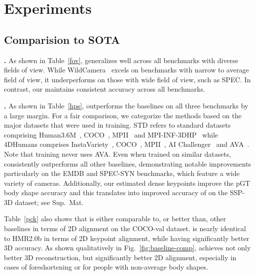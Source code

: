 \section{Experiments}

\subsection{Comparision to SOTA}
\noindent\textbf{\cameramodel.}
As shown in Table~\ref{fov},  \cameramodel generalizes well across all benchmarks with diverse fields of view. While WildCamera~\cite{wildcamera} excels on benchmarks with narrow to average field of view, it underperforms on those with wide field of view, such as SPEC. In contrast, our \cameramodel maintains consistent accuracy across all benchmarks.

\noindent\textbf{\hpsmodel.}
As shown in Table~\ref{hps}, \hpsmodel outperforms the baselines on all three benchmarks by a large margin. For a fair comparison, we categorize the methods based on the major datasets that were used in training. 
STD refers to standard datasets comprising Human3.6M~\cite{h36m}, COCO~\cite{coco}, MPII~\cite{mpii} and MPI-INF-3DHP~\cite{mpiinf3dhp} while 4DHumans comprises InstaVariety~\cite{insta}, COCO~\cite{coco}, MPII~\cite{mpii}, AI Challenger~\cite{aic} and  AVA~\cite{ava}. 
Note that \hpsmodel training never uses AVA.
Even when trained on similar datasets, \hpsmodel consistently outperforms all other baselines, demonstrating notable improvements particularly on the  EMDB and SPEC-SYN benchmarks, which feature a wide variety of cameras. 
Additionally, our estimated dense keypoints improve the pGT body shape accuracy and this translates into improved accuracy of \hpsmodel on the SSP-3D \cite{ssp} dataset; see Sup.~Mat. 

Table~\ref{pck} also shows that \hpsmodel is either comparable to, or better than, other baselines in terms of 2D alignment on the COCO-val dataset.
\hpsmodel is nearly identical to HMR2.0b in terms of 2D keypoint alignment, while having significantly better 3D accuracy.
As shown qualitatively  in Fig.~\ref{fig:baseline-comp}, \hpsmodel achieves not only better 3D reconstruction, but significantly better 2D alignment, especially in cases of foreshortening or for people with non-average body shapes.



